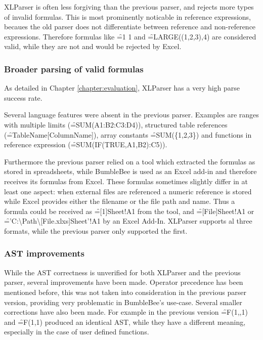 XLParser is often less forgiving than the previous parser, and rejects more types of invalid formulas.
This is most prominently noticable in reference expressions, becaues the old parser does not differentiate between reference and non-reference expressions.
Therefore formulas like \f{=1 1} and \f{=LARGE((1,2,3),4)} are considered valid, while they are not and would be rejected by Excel.

\subsubsection{Broader parsing of valid formulas}

As detailed in Chapter \ref{chapter:evaluation}, XLParser has a very high parse success rate.

Several language features were absent in the previous parser.
Examples are ranges with multiple limits (\f{=SUM(A1:B2:C3:D4)}), structured table references (\f{=TableName[ColumnName]}), array constants \f{=SUM(\{1,2,3\})} and functions in reference expression (\f{=SUM(IF(TRUE,A1,B2):C5)}).

Furthermore the previous parser relied on a tool which extracted the formulas as stored in spreadsheets, while BumbleBee is used as an Excel add-in and therefore receives its formulas from Excel.
These formulas sometimes slightly differ in at least one aspect: when external files are referenced a numeric reference is stored while Excel provides either the filename or the file path and name.
Thus a formula could be received as \f{=[1]Sheet!A1} from the tool, and \f{=[File]Sheet!A1} or \f{='C:\textbackslash Path\textbackslash [File.xlxs]Sheet'!A1} by an Excel Add-In.
XLParser supports al three formats, while the previous parser only supported the first.

\subsubsection{AST improvements}


While the AST correctness is unverified for both XLParser and the previous parser, several improvements have been made.
Operator precedence has been mentioned before, this was not taken into consideration in the previous parser version, providing very problematic in BumbleBee's use-case.
Several smaller corrections have also been made.
For example in the previous version \f{=F(1,,1)} and \f{=F(1,1)} produced an identical AST, while they have a different meaning, especially in the case of user defined functions.

